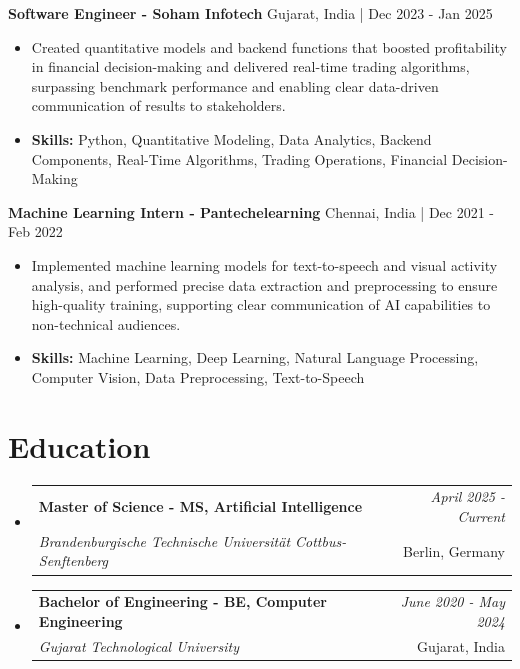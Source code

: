 \documentclass[a4paper,11pt]{article}
\makeatletter
\newcommand{\resumeSubheading}[4]{
\vspace{0.5mm}\item
    \begin{tabular*}{0.98\textwidth}[t]{l@{\extracolsep{\fill}}r}
        \textbf{#1} & \textit{\footnotesize{#4}} \\
        \textit{\footnotesize{#3}} &  \footnotesize{#2}\\
    \end{tabular*}
    \vspace{-2.4mm}
}
\makeatother
\begin{document}
\vspace{1mm}
  \textbf{Software Engineer - Soham Infotech} \hfill Gujarat, India | Dec 2023 - Jan 2025
\vspace{-1.5mm} %
\begin{itemize}
  \item Created quantitative models and backend functions that boosted profitability in financial decision-making and delivered real-time trading algorithms, surpassing benchmark performance and enabling clear data-driven communication of results to stakeholders.

\vspace{-2mm}
  \item \textbf{Skills:} Python, Quantitative Modeling, Data Analytics, Backend Components, Real-Time Algorithms, Trading Operations, Financial Decision-Making
\end{itemize}

\vspace{1mm}
  \textbf{Machine Learning Intern - Pantechelearning} \hfill Chennai, India | Dec 2021 - Feb 2022
\vspace{-1.5mm} %
\begin{itemize}
  \item Implemented machine learning models for text-to-speech and visual activity analysis, and performed precise data extraction and preprocessing to ensure high-quality training, supporting clear communication of AI capabilities to non-technical audiences.
\vspace{-2mm}
  \item \textbf{Skills:} Machine Learning, Deep Learning, Natural Language Processing, Computer Vision, Data Preprocessing, Text-to-Speech
\end{itemize}\section{\textbf{Education}}
\vspace{-0.4mm}

\begin{itemize}
\resumeSubheading
{Master of Science - MS, Artificial Intelligence }{Berlin, Germany}
{Brandenburgische Technische Universität Cottbus-Senftenberg  }{April 2025 - Current}

\vspace{1.0mm} %
\resumeSubheading
{Bachelor of Engineering - BE, Computer Engineering  }{Gujarat, India}
{Gujarat Technological University }{June 2020 - May 2024}

\end{itemize}
\end{document}
